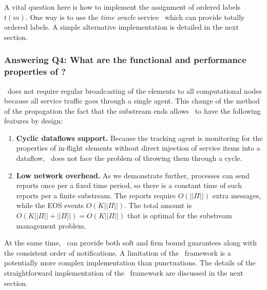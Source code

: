 A vital question here is how to implement the assignment of ordered labels $t(m)$. One way is to use the {\em time oracle} service~\cite{10.14778/3055330.3055335} which can provide totally ordered labels. A simple alternative implementation is detailed in the next section. 

\subsubsection{Answering Q4: What are the functional and performance properties of \tracker?}

\tracker\ does not require regular broadcasting of the elements to all computational nodes because all service traffic goes through a single agent. This change of the method of the propagation the fact that the substream ends allows \tracker\ to have the following features by design:

\begin{enumerate}
    \item {\bf Cyclic dataflows support.} Because the tracking agent is monitoring for the properties of in-flight elements without direct injection of service items into a dataflow, \tracker\ does not face the problem of throwing them through a cycle.
    \item {\bf Low network overhead.} As we demonstrate further, processes can send reports once per a fixed time period, so there is a constant time of such reports per a finite substream. The reports require $O(||\Pi||)$ extra messages, while the EOS events $O(K||\Pi||)$. The total amount is $O(K||\Pi|| + ||\Pi||) = O(K||\Pi||)$ that is optimal for the substream management problem. 
\end{enumerate}

At the same time, \tracker\ can provide both soft and firm bound guarantees along with the consistent order of notifications. A limitation of the \tracker\ framework is a potentially more complex implementation than punctuations. The details of the straightforward implementation of the \tracker\ framework are discussed in the next section.
